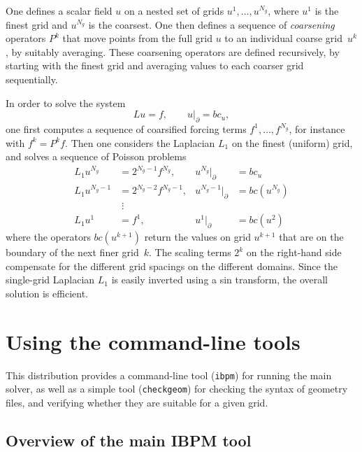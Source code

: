 \documentclass[11pt]{article}
\begin{document}
One defines a scalar field $u$ on a nested set of grids $u^1,\ldots,u^{N_g}$, where $u^1$ is the finest grid and $u^{N_g}$ is the coarsest.  One then defines a sequence of {\em coarsening} operators $P^k$ that move points from the full grid $u$ to an individual coarse grid~$u^k$, by suitably averaging.  These coarsening operators are defined recursively, by starting with the finest grid and averaging values to each coarser grid sequentially.

In order to solve the system
\begin{equation}
	Lu = f,\qquad u\big|_\partial = bc_u,
\end{equation}
one first computes a sequence of coarsified forcing terms $f^1,\ldots,f^{N_g}$, for instance with $f^{k} = P^{k}f$. Then one considers the Laplacian $L_1$ on the finest (uniform) grid, and solves a sequence of Poisson problems
\begin{equation}
\begin{aligned}
	L_1 u^{N_g} &= 2^{N_g-1} f^{N_g},& u^{N_g}\big|_\partial &= bc_u\\
	L_1 u^{N_g-1} &= 2^{N_g-2} f^{N_g-1},& u^{N_g-1}\big|_\partial &= bc(u^{N_g})\\
	&\;\vdots\\
	L_1 u^1 &= f^1,& u^1\big|_\partial &= bc(u^2)
\end{aligned}
\end{equation}
where the operators $bc(u^{k+1})$ return the values on grid $u^{k+1}$ that are on the boundary of the next finer grid~$k$.  The scaling terms $2^k$ on the right-hand side compensate for the different grid spacings on the different domains.  Since the single-grid Laplacian $L_1$ is easily inverted using a sin transform, the overall solution is efficient.

\section{Using the command-line tools}
\label{sec:commandline}

This distribution provides a command-line tool ({\tt ibpm}) for running the main solver, as well as a simple tool ({\tt checkgeom}) for checking the syntax of geometry files, and verifying whether they are suitable for a given grid.

\subsection{Overview of the main IBPM tool}
\label{sub:overview_of_the_main_ibpm_tool}
\end{document}
